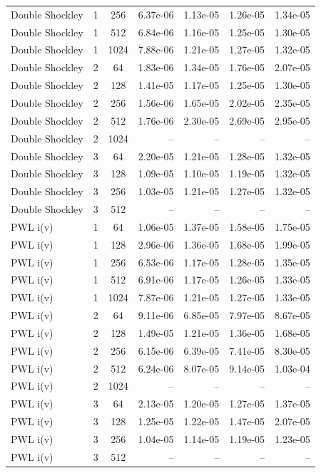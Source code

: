 {\begin{longtable}{lccrrrr}
Double Shockley & 1 & 256 & 6.37e-06 & 1.13e-05 & 1.26e-05 & 1.34e-05\\
Double Shockley & 1 & 512 & 6.84e-06 & 1.16e-05 & 1.25e-05 & 1.30e-05\\
Double Shockley & 1 & 1024 & 7.88e-06 & 1.21e-05 & 1.27e-05 & 1.32e-05\\
Double Shockley & 2 & 64 & 1.83e-06 & 1.34e-05 & 1.76e-05 & 2.07e-05\\
Double Shockley & 2 & 128 & 1.41e-05 & 1.17e-05 & 1.25e-05 & 1.30e-05\\
Double Shockley & 2 & 256 & 1.56e-06 & 1.65e-05 & 2.02e-05 & 2.35e-05\\
Double Shockley & 2 & 512 & 1.76e-06 & 2.30e-05 & 2.69e-05 & 2.95e-05\\
Double Shockley & 2 & 1024 & -- & -- & -- & --\\
Double Shockley & 3 & 64 & 2.20e-05 & 1.21e-05 & 1.28e-05 & 1.32e-05\\
Double Shockley & 3 & 128 & 1.09e-05 & 1.10e-05 & 1.19e-05 & 1.32e-05\\
Double Shockley & 3 & 256 & 1.03e-05 & 1.21e-05 & 1.27e-05 & 1.32e-05\\
Double Shockley & 3 & 512 & -- & -- & -- & --\\
\addlinespace
PWL i(v) & 1 & 64 & 1.06e-05 & 1.37e-05 & 1.58e-05 & 1.75e-05\\
PWL i(v) & 1 & 128 & 2.96e-06 & 1.36e-05 & 1.68e-05 & 1.99e-05\\
PWL i(v) & 1 & 256 & 6.53e-06 & 1.17e-05 & 1.28e-05 & 1.35e-05\\
PWL i(v) & 1 & 512 & 6.91e-06 & 1.17e-05 & 1.26e-05 & 1.33e-05\\
PWL i(v) & 1 & 1024 & 7.87e-06 & 1.21e-05 & 1.27e-05 & 1.33e-05\\
PWL i(v) & 2 & 64 & 9.11e-06 & 6.85e-05 & 7.97e-05 & 8.67e-05\\
PWL i(v) & 2 & 128 & 1.49e-05 & 1.21e-05 & 1.36e-05 & 1.68e-05\\
PWL i(v) & 2 & 256 & 6.15e-06 & 6.39e-05 & 7.41e-05 & 8.30e-05\\
PWL i(v) & 2 & 512 & 6.24e-06 & 8.07e-05 & 9.14e-05 & 1.03e-04\\
PWL i(v) & 2 & 1024 & -- & -- & -- & --\\
PWL i(v) & 3 & 64 & 2.13e-05 & 1.20e-05 & 1.27e-05 & 1.37e-05\\
PWL i(v) & 3 & 128 & 1.25e-05 & 1.22e-05 & 1.47e-05 & 2.07e-05\\
PWL i(v) & 3 & 256 & 1.04e-05 & 1.14e-05 & 1.19e-05 & 1.23e-05\\
PWL i(v) & 3 & 512 & -- & -- & -- & --\\
\end{longtable}
}
